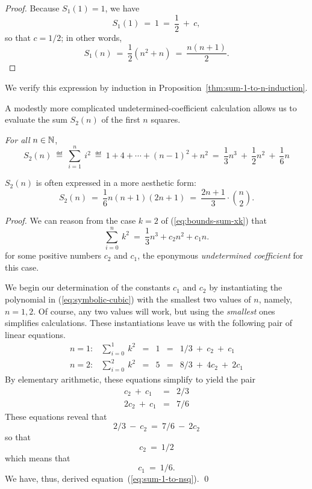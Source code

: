 \documentclass{article}
\begin{document}
\begin{itemize}
\begin{proof}
Because $S_1(1) = 1$, we
have
\[ S_1(1) \ = \ 1 \ = \ \frac{1}{2} \ + \ c, \]
so that $c = 1/2$; in other words,
\[ S_1(n) \ = \ \frac{1}{2} \left( n^2 + n \right) \ = \ 
\frac{n(n+1)}{2}.
\]
\end{proof}
We verify this expression by induction in
Proposition~\ref{thm:sum-1-to-n-induction}.

\medskip

%
A modestly more complicated undetermined-coefficient calculation
allows us to evaluate the sum $S_2(n)$ of the first $n$ squares.

{\em For all} $n \in \mathbb{N}$,
\begin{equation}
\label{eq:sum-1-to-nsq}
S_2(n) \ \eqdef \ \sum_{i=1}^n \ i^2 
 \ \eqdef \  1 + 4 + \cdots + (n-1)^2 + n^2
 \ = \ \frac{1}{3} n^3 \ + \ \frac{1}{2} n^2 \ + \ \frac{1}{6} n
\end{equation}

$S_2(n)$ is often expressed in a more aesthetic form:
\[ S_2(n) \ = \
\frac{1}{6} n (n+1)(2n+1) \ = \
\frac{2n+1}{3} \cdot {n \choose 2}.
\]

\begin{proof}
We can reason from the case $k=2$ of (\ref{eq:bounds-sum-xk}) that
\begin{equation}
\label{eq:symbolic-cubic}
\sum_{i=0}^n \ k^2 \ = \ \frac{1}{3} n^3 + c_2 n^2 + c_1 n.
\end{equation}
for some positive numbers $c_2$ and $c_1$, the eponymous {\it
  undetermined coefficient} for this case.

We begin our determination of the constants $c_1$ and $c_2$ by
instantiating the polynomial in (\ref{eq:symbolic-cubic}) with the
smallest two values of $n$, namely, $n = 1,2$.  Of course, any two
values will work, but using the {\em smallest} ones simplifies
calculations.  These instantiations leave us with the following pair
of linear equations.
\[
\begin{array}{cccccl}
n=1: & \sum_{i=0}^1 \ k^2
   & = & 1 & = &
1/3 \ + \ c_2 \ + \ c_1 \\
n=2: & \sum_{i=0}^2 \ k^2
   & = & 5 & = &
8/3 \ + \ 4 c_2 \ + \ 2 c_1
\end{array}
\]
By elementary arithmetic, these equations simplify to yield the pair
\[
\begin{array}{ccc}
c_2 \ + \ c_1   & = & 2/3 \\
2 c_2 \ + \ c_1 & = & 7/6
\end{array}
\]
These equations reveal that
\[ 2/3 \ - \ c_2 \ = \ 7/6 \ - \ 2 c_2 \]
so that 
\[ c_2 \ = \ 1/2 \]
which means that
\[ c_1 \ = \ 1/6. \]
We have, thus, derived equation~(\ref{eq:sum-1-to-nsq}).  \qed
\end{proof}


\end{itemize}
\end{document}
